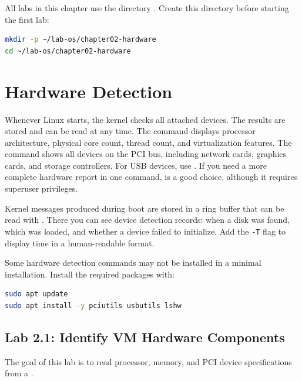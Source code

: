 \begin{notebox}
All labs in this chapter use the directory .
Create this directory before starting the first lab:
\begin{lstlisting}[language=bash]
mkdir -p ~/lab-os/chapter02-hardware
cd ~/lab-os/chapter02-hardware
\end{lstlisting}
\end{notebox}

\section{Hardware Detection}
\label{sec:hardware-detection}

Whenever Linux starts, the kernel checks all attached devices. The results are stored and can be read at any time. The  command displays processor architecture, physical core count, thread count, and virtualization features. The  command shows all devices on the PCI bus, including network cards, graphics cards, and storage controllers. For USB devices, use . If you need a more complete hardware report in one command,  is a good choice, although it requires superuser privileges.

Kernel messages produced during boot are stored in a ring buffer that can be read with . There you can see device detection records: when a disk was found, which  was loaded, and whether a device failed to initialize. Add the \texttt{-T} flag to display time in a human-readable format.

\begin{tipbox}
Some hardware detection commands may not be installed in a minimal installation. Install the required packages with:
\begin{lstlisting}[language=bash]
sudo apt update
sudo apt install -y pciutils usbutils lshw
\end{lstlisting}
\end{tipbox}

\subsection*{Lab 2.1: Identify VM Hardware Components}

The goal of this lab is to read processor, memory, and PCI device specifications from a .

